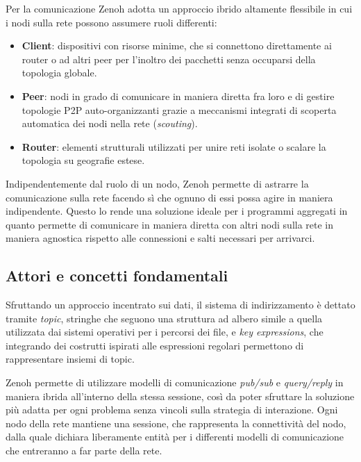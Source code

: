 Per la comunicazione Zenoh adotta un approccio ibrido altamente flessibile in cui
i nodi sulla rete possono assumere ruoli differenti:

\begin{itemize}
    \item \textbf{Client}: dispositivi con risorse minime, che si connettono
    direttamente ai router o ad altri peer per l'inoltro dei pacchetti senza
    occuparsi della topologia globale.
    \item \textbf{Peer}: nodi in grado di comunicare in maniera diretta fra loro
    e di gestire topologie \ac{P2P} auto-organizzanti grazie a meccanismi integrati
    di scoperta automatica dei nodi nella rete (\emph{scouting}).
    \item \textbf{Router}: elementi strutturali utilizzati per unire reti isolate
    o scalare la topologia su geografie estese.
\end{itemize}

Indipendentemente dal ruolo di un nodo, Zenoh permette di astrarre la comunicazione sulla rete
facendo sì che ognuno di essi possa agire in maniera indipendente. Questo lo rende una
soluzione ideale per i programmi aggregati in quanto permette di comunicare in
maniera diretta con altri nodi sulla rete in maniera agnostica rispetto alle connessioni
e salti necessari per arrivarci.

\subsection{Attori e concetti fondamentali}
\label{ssec:zenoh-actors-and-fundamental-concepts}

Sfruttando un approccio incentrato sui dati, il sistema di indirizzamento è dettato tramite
\emph{topic}, stringhe che seguono una struttura ad albero simile a quella utilizzata dai
sistemi operativi per i percorsi dei file, e \emph{key expressions}, che integrando
dei costrutti ispirati alle espressioni regolari permettono di rappresentare insiemi
di topic.

Zenoh permette di utilizzare modelli di comunicazione \emph{pub/sub} e \emph{query/reply}
in maniera ibrida all'interno della stessa sessione, così da poter sfruttare
la soluzione più adatta per ogni problema senza vincoli sulla strategia di interazione.
Ogni nodo della rete mantiene una sessione, che rappresenta la connettività del nodo,
dalla quale dichiara liberamente entità per i differenti modelli di comunicazione
che entreranno a far parte della rete.


